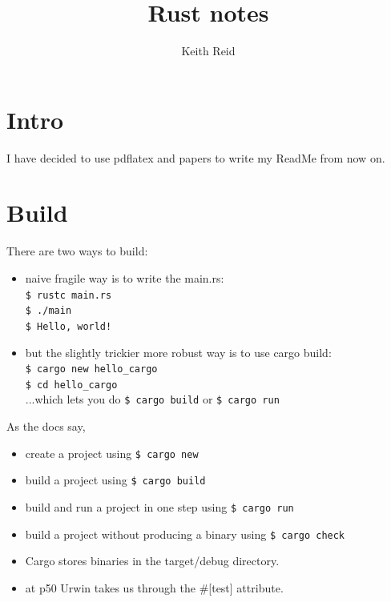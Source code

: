 \documentclass[10pt,a4paper]{article}
\title{Rust notes}
\author{Keith Reid}
\begin{document}
\maketitle{}
\section{Intro}
I have decided to use pdflatex and papers to write my ReadMe from now on.

\section{Build}
There are two ways to build:
\begin{itemize}
  \item naive fragile way is to write the main.rs:\\
    \texttt{\$ rustc main.rs}\\
    \texttt{\$ ./main}\\
    \texttt{\$ Hello, world!}\\

  \item but the slightly trickier more robust way is to use cargo build:\\
    \texttt{\$ cargo new hello\_cargo}\\
    \texttt{\$ cd hello\_cargo}\\
    ...which lets you do \texttt{\$ cargo build} or \texttt{\$ cargo run}
\end{itemize}

As the docs say, 

\begin{itemize}
  \item create a project using \texttt{\$ cargo new}
  \item build a project using \texttt{\$ cargo build}
  \item build and run a project in one step using \texttt{\$ cargo run}
  \item build a project without producing a binary using \texttt{\$ cargo check}
   \item Cargo stores binaries in the target/debug directory.
   \item at p50 Urwin takes us through the \#[test] attribute.
\end{itemize}
\end{document}
